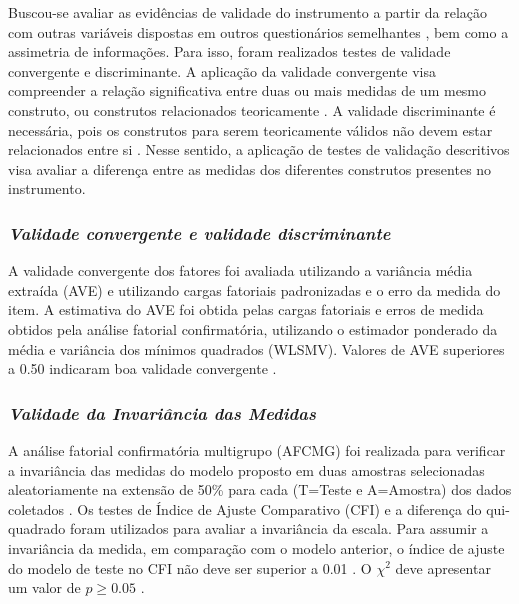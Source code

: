 Buscou-se avaliar as evidências de validade do instrumento a partir da relação com outras variáveis dispostas em outros questionários semelhantes \cite{Souza2017}, bem como a assimetria de informações. Para isso, foram realizados testes de validade convergente e discriminante. A aplicação da validade convergente visa compreender a relação significativa entre duas ou mais medidas de um mesmo construto, ou construtos relacionados teoricamente \cite{Cunningham2016ImplicitValidity}. A validade discriminante é necessária, pois os construtos para serem teoricamente válidos não devem estar relacionados entre si \cite{Hubley2014DiscriminantValidity}. Nesse sentido, a aplicação de testes de validação descritivos visa avaliar a diferença entre as medidas dos diferentes construtos presentes no instrumento.

\subsubsection*{\textit{Validade convergente e validade discriminante}}

A validade convergente dos fatores foi avaliada utilizando a variância média extraída (AVE) e utilizando cargas fatoriais padronizadas e o erro da medida do item. A estimativa do AVE foi obtida pelas cargas fatoriais e erros de medida obtidos pela análise fatorial confirmatória, utilizando o estimador ponderado da média e variância dos mínimos quadrados (WLSMV). Valores de AVE superiores a 0.50 indicaram boa validade convergente \cite{Maroco2014}. 

\subsubsection*{\textit{Validade da Invariância das Medidas}}

A análise fatorial confirmatória multigrupo (AFCMG) foi realizada para verificar a invariância das medidas do modelo proposto em duas amostras selecionadas aleatoriamente na extensão de 50\% para cada (T=Teste e A=Amostra) dos dados coletados \cite{Borsa2018}. Os testes de Índice de Ajuste Comparativo (CFI) e a diferença do qui-quadrado foram utilizados para avaliar a invariância da escala. Para assumir a invariância da medida, em comparação com o modelo anterior, o índice de ajuste do modelo de teste no CFI não deve ser superior a 0.01 \cite{Cheung2002EvaluatingInvariance}. O ${\chi}^2$ deve apresentar um valor de $p \geq 0.05$ \cite{Milfont2010TestingResearch.,Zait2011MethodsValidity}. 

